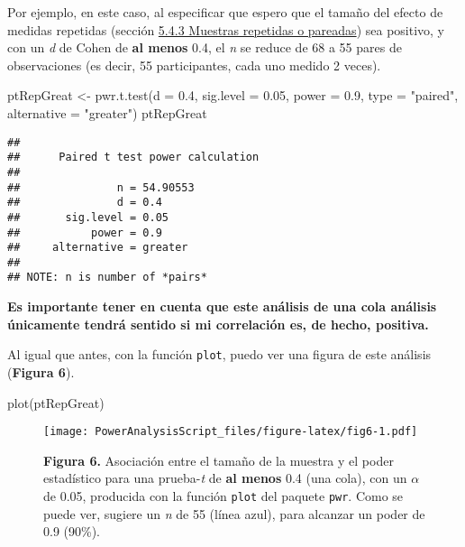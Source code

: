 \documentclass[
]{article}
\newenvironment{Shaded}{\begin{snugshade}}{\end{snugshade}}
\newcommand{\AttributeTok}[1]{\textcolor[rgb]{0.16,0.50,0.73}{#1}}
\newcommand{\FloatTok}[1]{\textcolor[rgb]{0.96,0.45,0.00}{#1}}
\newcommand{\FunctionTok}[1]{\textcolor[rgb]{0.56,0.27,0.68}{#1}}
\newcommand{\NormalTok}[1]{\textcolor[rgb]{0.81,0.81,0.76}{#1}}
\newcommand{\OtherTok}[1]{\textcolor[rgb]{0.15,0.68,0.38}{#1}}
\newcommand{\StringTok}[1]{\textcolor[rgb]{0.96,0.31,0.31}{#1}}
\begin{document}
Por ejemplo, en este caso, al especificar que espero que el tamaño del
efecto de medidas repetidas (sección \protect\hyperlink{TRep}{5.4.3
Muestras repetidas o pareadas}) sea positivo, y con un \emph{d} de Cohen
de \textbf{al menos} 0.4, el \emph{n} se reduce de 68 a 55 pares de
observaciones (es decir, 55 participantes, cada uno medido 2 veces).

\begin{Shaded}
\begin{Highlighting}[]
\NormalTok{ptRepGreat }\OtherTok{\textless{}{-}} \FunctionTok{pwr.t.test}\NormalTok{(}\AttributeTok{d =} \FloatTok{0.4}\NormalTok{,}
                    \AttributeTok{sig.level =} \FloatTok{0.05}\NormalTok{,}
                    \AttributeTok{power =} \FloatTok{0.9}\NormalTok{,}
                    \AttributeTok{type =} \StringTok{"paired"}\NormalTok{,}
                    \AttributeTok{alternative =} \StringTok{"greater"}\NormalTok{)}
\NormalTok{ptRepGreat}
\end{Highlighting}
\end{Shaded}

\begin{verbatim}
## 
##      Paired t test power calculation 
## 
##               n = 54.90553
##               d = 0.4
##       sig.level = 0.05
##           power = 0.9
##     alternative = greater
## 
## NOTE: n is number of *pairs*
\end{verbatim}

\textcolor{red}{\faBookmark} \textbf{Es importante tener en cuenta que
este análisis de una cola análisis únicamente tendrá sentido si mi
correlación es, de hecho, positiva.}

Al igual que antes, con la función \texttt{plot}, puedo ver una figura
de este análisis (\textbf{Figura 6}).

\begin{Shaded}
\begin{Highlighting}[]
\FunctionTok{plot}\NormalTok{(ptRepGreat)}
\end{Highlighting}
\end{Shaded}

\begin{figure}
\centering
\texttt{[image: PowerAnalysisScript\_files/figure-latex/fig6-1.pdf]}
\caption{\textbf{Figura 6.} Asociación entre el tamaño de la muestra y
el poder estadístico para una prueba-\emph{t} de \textbf{al menos} 0.4
(una cola), con un \(\alpha\) de 0.05, producida con la función
\texttt{plot} del paquete \texttt{pwr}. Como se puede ver, sugiere un
\emph{n} de 55 (línea azul), para alcanzar un poder de 0.9 (90\%).}
\end{figure}
\end{document}
